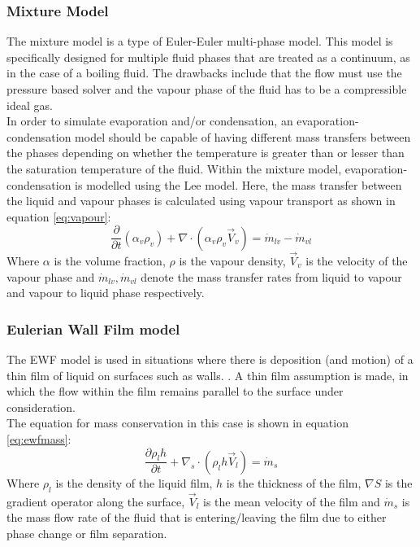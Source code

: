 \documentclass[11pt,a4paper,twoside,oneside]{article}
\begin{document}
\subsubsection{Mixture Model}\label{sec:eulereuler}
The mixture model is a type of Euler-Euler multi-phase model. This model is specifically designed for multiple fluid phases that are treated as a continuum, as in the case of a boiling fluid. The drawbacks include that the flow must use the pressure based solver and the vapour phase of the fluid has to be a compressible ideal gas\cite{brennanmultiphase}\cite{stdeulermodel}.\\
In order to simulate evaporation and/or condensation, an evaporation-condensation model should be capable of having different mass transfers between the phases depending on whether the temperature is greater than or lesser than the saturation temperature of the fluid. Within the mixture model, evaporation-condensation is modelled using the Lee model\cite{leemodel}. Here, the mass transfer between the liquid and vapour phases is calculated using vapour transport as shown in equation \ref{eq:vapour}:
\begin{equation}
    \label{eq:vapour}
    \frac{\partial}{\partial t}\left(\alpha_{v} \rho_{v}\right)+\nabla \cdot\left(\alpha_{v} \rho_{v} \vec{V}_{v}\right)=\dot{m}_{l v}-\dot{m}_{v l}
\end{equation}
Where $\alpha$ is the volume fraction, $\rho$ is the vapour density, $\vec{V}_v$ is the velocity of the vapour phase and $\dot{m}_{lv},\dot{m}_{vl}$ denote the mass transfer rates from liquid to vapour and vapour to liquid phase respectively\cite{leemodel}.

\subsubsection{Eulerian Wall Film model}\label{sec:ewf}
The EWF model is used in situations where there is deposition (and motion) of a thin film of liquid on surfaces such as walls. \cite{orourke}\cite{briantft}. A thin film assumption is made, in which the flow within the film remains parallel to the surface under consideration.\\
The equation for mass conservation in this case is shown in equation \ref{eq:ewfmass}:
\begin{equation}\label{eq:ewfmass}
    \frac{\partial \rho_{l} h}{\partial t}+\nabla_{s} \cdot\left(\rho_{l} h \vec{V}_{l}\right)=\dot{m}_{s}
\end{equation}
Where $\rho_l$ is the density of the liquid film, $h$ is the thickness of the film, $\nabla S$ is the gradient operator along the surface, $\vec{V}_l$ is the mean velocity of the film and $\dot{m}_s$ is the mass flow rate of the fluid that is entering/leaving the film due to either phase change or film separation.
\end{document}
